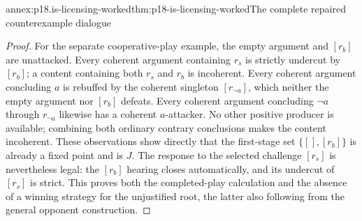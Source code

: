 \begin{annexitem}{annex:p18.is-licensing-worked}{thm:p18-is-licensing-worked}{The complete repaired counterexample dialogue}
\begin{proof}
For the separate cooperative-play example, the empty argument
and \([r_b]\) are unattacked. Every coherent argument containing
\(r_s\) is strictly undercut by \([r_b]\); a content containing
both \(r_s\) and \(r_b\) is incoherent.
Every coherent argument concluding \(a\) is rebuffed by the
coherent singleton \([r_{\neg a}]\), which neither the empty
argument nor \([r_b]\) defeats.
Every coherent argument concluding \(\neg a\) through
\(r_{\neg a}\) likewise has a coherent \(a\)-attacker.
No other positive producer is available; combining both
ordinary contrary conclusions makes the content incoherent.
These observations show directly that the first-stage set
\(\{[],[r_b]\}\) is already a fixed point and is \(J\).
The response to the selected challenge \([r_s]\) is nevertheless
legal: the \([r_b]\) hearing closes automatically, and its
undercut of \([r_s]\) is strict.
This proves both the completed-play calculation and the absence
of a winning strategy for the unjustified root, the latter also
following from the general opponent construction.
\end{proof}
\end{annexitem}

